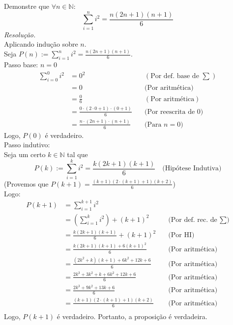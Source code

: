 Demonstre que $\forall n \in \mathbb{N}$:
\begin{displaymath}
	\sum\limits_{i=1}^n i^2 = \frac{n (2n+1) (n+1)}{6}
\end{displaymath}
\emph{Resolução.} \\
Aplicando indução sobre $n$. \\
Seja $P(n) := \sum\limits_{i=1}^n i^2 = \frac{n (2n+1) (n+1)}{6}$. \\
Passo base: $n = 0$
\begin{align*}
	\sum\limits_{i=0}^0 i^2 & = 0^2                                             & \quad(\text{Por def. base de $\sum$}) \\
	                        & = 0                                               & \quad \text{(Por aritmética)}         \\
	                        & = \frac{0}{6}                                     & \quad(\text{Por aritmética})          \\
	                        & = \frac{0 \cdot (2 \cdot 0 + 1) \cdot (0 + 1)}{6} & \quad \text{(Por reescrita de 0)}     \\
	                        & = \frac{n \cdot (2n + 1) \cdot (n + 1)}{6}        & \quad \text{(Para $n = 0$)}
\end{align*}
Logo, $P(0)$ é verdadeiro. \\
Passo indutivo: \\
Seja um certo $k \in \mathbb{N}$ tal que
\begin{displaymath}
	P(k):= \sum\limits_{i=1}^k i^2 = \frac{k (2k+1) (k+1)}{6} \quad \text{(Hipótese Indutiva)}
\end{displaymath}
(Provemos que $P(k+1) = \frac{(k+1) (2 \cdot (k+1) + 1) (k + 2)}{6}$) \\
Logo:
\begin{align*}
	P(k+1) & = \sum\limits_{i=1}^{k+1} i^2                                                            \\
	       & = (\sum\limits_{i=1}^{k} i^2) + (k+1)^2         & \quad \text{(Por def. rec. de $\sum$)} \\
	       & = \frac{k (2k+1) (k+1)}{6} + (k+1)^2            & \quad \text{(Por HI)}                  \\
	       & = \frac{k (2k+1) (k+1) + 6(k+1)^2}{6}           & \quad \text{(Por aritmética)}          \\
	       & = \frac{(2k^2 + k) (k+1) + 6k^2 + 12k + 6}{6}   & \quad \text{(Por aritmética)}          \\
	       & = \frac{2k^3 + 3k^2 + k + 6k^2 + 12k + 6}{6}    & \quad \text{(Por aritmética)}          \\
	       & = \frac{2k^3 + 9k^2 + 13k + 6}{6}               & \quad \text{(Por aritmética)}          \\
	       & = \frac{(k + 1) (2 \cdot (k+1) + 1) (k + 2)}{6} & \quad \text{(Por aritmética)}          \\
\end{align*}
Logo, $P(k+1)$ é verdadeiro.
Portanto, a proposição é verdadeira.
